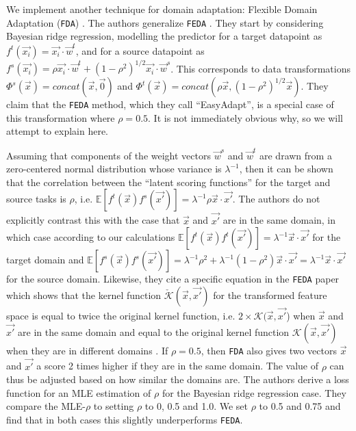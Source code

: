 \documentclass{article}
\begin{document}
We implement another technique for domain adaptation: Flexible Domain Adaptation (\texttt{FDA}) \citep{easiest}. The authors generalize \texttt{FEDA} \citep{daume}. They start by considering Bayesian ridge regression, modelling the predictor for a target datapoint as \(f^t(\vec{x_i}) = \vec{x_i} \cdot \vec{w}^t\), and for a source datapoint as \(f^s(\vec{x_i}) = \rho \vec{x_i} \cdot \vec{w}^t + (1 - \rho^2)^{1/2}\vec{x_i} \cdot \vec{w}^s\). This corresponds to data transformations \(\Phi^s(\vec{x}) = concat(\vec{x}, \vec{0}) \) and \(\Phi^t(\vec{x}) = concat(\rho\vec{x}, (1 - \rho^2)^{1/2}\vec{x})\). They claim that the \texttt{FEDA} method, which they call ``EasyAdapt'', is a special case of this transformation where \(\rho = 0.5\). It is not immediately obvious why, so we will attempt to explain here.

Assuming that components of the weight vectors \(\vec{w}^s\) and \(\vec{w}^t\) are drawn from a zero-centered normal distribution whose variance is \(\lambda^{-1}\), then it can be shown that the correlation between the ``latent scoring functions'' for the target and source tasks is \(\rho\), i.e. \(\mathbb{E}[f^t(\vec{x})f^s(\vec{x'})] = \lambda^{-1}\rho \vec{x} \cdot \vec{x'}\). The authors do not explicitly contrast this with the case that \(\vec{x}\) and \(\vec{x'}\) are in the same domain, in which case according to our calculations \(\mathbb{E}[f^t(\vec{x})f^t(\vec{x'})] = \lambda^{-1} \vec{x} \cdot \vec{x'}\) for the target domain and \(\mathbb{E}[f^s(\vec{x})f^s(\vec{x'})] = \lambda^{-1}\rho^2 + \lambda^{-1} (1 - \rho^2)\vec{x} \cdot \vec{x'} = \lambda^{-1}\vec{x}\cdot\vec{x'}\) for the source domain. Likewise, they cite a specific equation in the \texttt{FEDA} paper which shows that the kernel function \(\check{\mathcal{K}}(\vec{x}, \vec{x'})\) for the transformed feature space is equal to twice the original kernel function, i.e. \(2 \times \mathcal{K}(\vec{x}, \vec{x'}\)) when \(\vec{x}\) and \(\vec{x'}\) are in the same domain and equal to the original kernel function \(\mathcal{K}(\vec{x}, \vec{x'})\) when they are in different domains \cite{easiest} \cite{daume}. If \(\rho = 0.5\), then \texttt{FDA} also gives two vectors \(\vec{x}\) and \(\vec{x'}\) a score 2 times higher if they are in the same domain. The value of \(\rho\) can thus be adjusted based on how similar the domains are. The authors derive a loss function for an MLE estimation of \(\rho\) for the Bayesian ridge regression case. They compare the MLE-\(\rho\) to setting \(\rho\) to 0, 0.5 and 1.0. We set \(\rho\) to 0.5 and 0.75 and find that in both cases this slightly underperforms \texttt{FEDA}.
\end{document}
